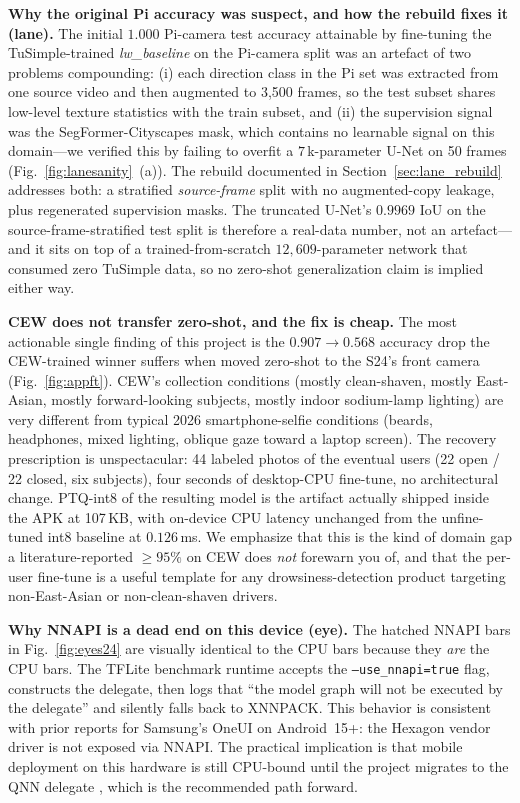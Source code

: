 \documentclass[conference]{IEEEtran}
\begin{document}
\textbf{Why the original Pi accuracy was suspect, and how the
rebuild fixes it (lane).}
The initial $1.000$ Pi-camera test accuracy attainable by
fine-tuning the TuSimple-trained \textit{lw\_baseline} on the
Pi-camera split was an artefact of two problems compounding: (i)
each direction class in the Pi set was extracted from one source
video and then augmented to 3{,}500 frames, so the test subset
shares low-level texture statistics with the train subset, and
(ii) the supervision signal was the SegFormer-Cityscapes mask,
which contains no learnable signal on this domain---we verified
this by failing to overfit a $7$\,k-parameter U-Net on 50 frames
(Fig.~\ref{fig:lanesanity}~(a)). The rebuild documented in
Section~\ref{sec:lane_rebuild} addresses both: a stratified
\emph{source-frame} split with no augmented-copy leakage, plus
regenerated supervision masks. The truncated U-Net's
$0.9969$ IoU on the source-frame-stratified test split is therefore
a real-data number, not an artefact---and it sits on top of a
trained-from-scratch $12{,}609$-parameter network that consumed
zero TuSimple data, so no zero-shot generalization claim is
implied either way.

\textbf{CEW does not transfer zero-shot, and the fix is cheap.}
The most actionable single finding of this project is the
$0.907 \rightarrow 0.568$ accuracy drop the CEW-trained winner
suffers when moved zero-shot to the S24's front camera
(Fig.~\ref{fig:appft}). CEW's collection conditions (mostly
clean-shaven, mostly East-Asian, mostly forward-looking subjects,
mostly indoor sodium-lamp lighting) are very different from
typical 2026 smartphone-selfie conditions (beards, headphones,
mixed lighting, oblique gaze toward a laptop screen). The
recovery prescription is unspectacular: 44 labeled photos of the
eventual users (22 open / 22 closed, six subjects), four seconds
of desktop-CPU fine-tune, no architectural change. PTQ-int8 of
the resulting model is the artifact actually shipped inside the
APK at 107\,KB, with on-device CPU latency unchanged
from the unfine-tuned int8 baseline at $0.126$\,ms. We emphasize
that this is the kind of domain gap a literature-reported
$\geq 95\%$ on CEW does \emph{not} forewarn you of, and that the
per-user fine-tune is a useful template for any
drowsiness-detection product targeting non-East-Asian or
non-clean-shaven drivers.

\textbf{Why NNAPI is a dead end on this device (eye).}
The hatched NNAPI bars in Fig.~\ref{fig:eyes24} are visually identical
to the CPU bars because they \emph{are} the CPU bars. The TFLite
benchmark runtime accepts the \texttt{--use\_nnapi=true} flag,
constructs the delegate, then logs that ``the model graph will not be
executed by the delegate'' and silently falls back to XNNPACK. This
behavior is consistent with prior reports for Samsung's OneUI on
Android~15+: the Hexagon vendor driver is not exposed via NNAPI. The
practical implication is that mobile deployment on this hardware is
still CPU-bound until the project migrates to the QNN
delegate \cite{qnn}, which is the recommended path forward.
\end{document}

